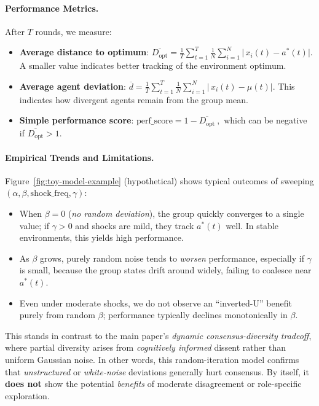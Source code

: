 \paragraph{Performance Metrics.}
After $T$ rounds, we measure:

\begin{itemize}
    \item \textbf{Average distance to optimum}:     
        \(\displaystyle
        \overline{D_{\text{opt}}}
        =
        \frac{1}{T}\sum_{t=1}^T
        \tfrac{1}{N}\sum_{i=1}^N \bigl|\,x_i(t) - a^*(t)\bigr|\).
    A smaller value indicates better tracking of the environment optimum.
    \item \textbf{Average agent deviation}:
    \(\displaystyle
    \overline{d} 
    =
    \frac{1}{T}\sum_{t=1}^T
    \tfrac{1}{N}\sum_{i=1}^N \bigl|\,x_i(t)-\mu(t)\bigr|.
    \)
    This indicates how divergent agents remain from the group mean.
    \item \textbf{Simple performance score}:
    \(\displaystyle
    \text{perf\_score} = 1 - \overline{D_{\text{opt}}}~,
    \)
    which can be negative if $\overline{D_{\text{opt}}}>1$.
\end{itemize}

\paragraph{Empirical Trends and Limitations.}
Figure~\ref{fig:toy-model-example} (hypothetical) shows typical outcomes of sweeping $(\alpha,\beta,\mathrm{shock\_freq},\gamma)$:
\begin{itemize} [itemsep=1pt, parsep=1pt, leftmargin=*]
    \item When $\beta=0$ (\emph{no random deviation}), the group quickly converges to a single value; if $\gamma>0$ and shocks are mild, they track $a^*(t)$ well. In stable environments, this yields high performance.
    \item As $\beta$ grows, purely random noise tends to \emph{worsen} performance, especially if $\gamma$ is small, because the group states drift around widely, failing to coalesce near $a^*(t)$.
    \item Even under moderate shocks, we do not observe an “inverted-U” benefit purely from random $\beta$; performance typically declines monotonically in $\beta$. 
\end{itemize}

This stands in contrast to the main paper’s \emph{dynamic consensus-diversity tradeoff}, where partial diversity arises from \emph{cognitively informed} dissent rather than uniform Gaussian noise. In other words, this random-iteration model confirms that \emph{unstructured} or \emph{white‐noise} deviations generally hurt consensus. By itself, it \textbf{does not} show the potential \emph{benefits} of moderate disagreement or role-specific exploration.

